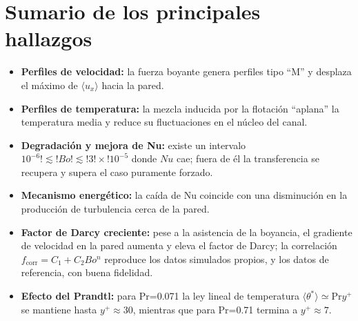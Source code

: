 \section{Sumario de los principales hallazgos}

\begin{itemize}

\item \textbf{Perfiles de velocidad:} la fuerza boyante genera perfiles tipo ``M'' y desplaza el máximo de $\langle u_x\rangle$ hacia la pared.

\item \textbf{Perfiles de temperatura:} la mezcla inducida por la flotación ``aplana'' la temperatura media y reduce su fluctuaciones en el núcleo del canal.

\item \textbf{Degradación y mejora de Nu:} existe un intervalo $10^{-6}!\lesssim!Bo!\lesssim!3!\times!10^{-5}$ donde $Nu$ cae; fuera de él la transferencia se recupera y supera el caso puramente forzado.

\item \textbf{Mecanismo energético:} la caída de Nu coincide con una disminución en la producción de turbulencia cerca de la pared.

\item \textbf{Factor de Darcy creciente:} pese a la asistencia de la boyancia, el gradiente de velocidad en la pared aumenta y eleva el factor de Darcy; la correlación $f_{\text{corr}}=C_1+C_2 Bo^n$ reproduce los datos simulados propios, y los datos de referencia, con buena fidelidad.

\item \textbf{Efecto del Prandtl:} para Pr=0.071 la ley lineal de temperatura $\langle\theta^*\rangle \simeq \text{Pr} y^+$ se mantiene hasta $y^+ \approx 30$, mientras que para Pr=0.71 termina a $y^+ \approx 7$.
\end{itemize}